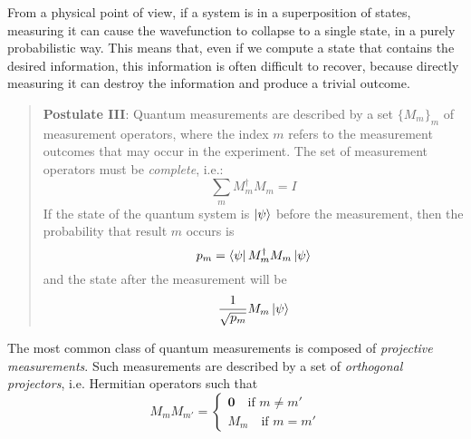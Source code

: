 From a physical point of view, if a system is in a superposition of states, measuring it can  cause the wavefunction to collapse to a single state, in a purely probabilistic way. This means that, even if we compute a state that contains the desired information, this information is often difficult to recover, because directly measuring  it can destroy the information and produce a trivial outcome.

\begin{quote} \textbf{Postulate III}: Quantum measurements are described by a set $\{M_m\}_m$ of measurement operators, where the index $m$ refers to the measurement outcomes that may occur in the experiment. The set of measurement operators must be \textit{complete}, i.e.:
\[\sum_m M_m^\dagger M_m = I\]
If the state of the quantum system is $\ket{\psi}$ before the measurement, then the probability that result $m$ occurs is 
\[p_m = \bra{\psi}M_m^\dagger M_m\ket{\psi}\]
and the state after the measurement will be \[\frac{1}{\sqrt{p_m}}M_m\ket{\psi}\]
\end{quote}

The most common class of quantum measurements is composed of \textit{projective measurements}. Such measurements are described by a set of \textit{orthogonal projectors}, i.e. Hermitian operators such that \[ M_mM_{m'} = \begin{cases}\mathbf{0}\quad\text{if } m \neq m' \\ M_m\quad\text{if }m = m'\end{cases}\]


